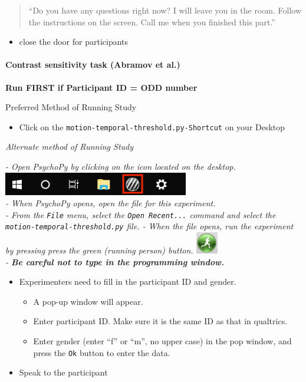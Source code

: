 \documentclass[]{article}
\providecommand{\tightlist}{%
  \setlength{\itemsep}{0pt}\setlength{\parskip}{0pt}}
\let\oldparagraph\paragraph
\renewcommand{\paragraph}[1]{\oldparagraph{#1}\mbox{}}
\begin{document}
\begin{quote}
``Do you have any questions right now? I will leave you in the room.
Follow the instructions on the screen. Call me when you finished this
part.''
\end{quote}

\begin{itemize}
\tightlist
\item
  close the door for participants
\end{itemize}

\hypertarget{contrast-sensitivity-task-abramov-et-al.}{%
\paragraph{Contrast sensitivity task (Abramov et
al.)}\label{contrast-sensitivity-task-abramov-et-al.}}

\textbf{Run FIRST if Participant ID = ODD number}

Preferred Method of Running Study

\begin{itemize}
\tightlist
\item
  Click on the \texttt{motion-temporal-threshold.py-Shortcut} on your
  Desktop
\end{itemize}

\emph{Alternate method of Running Study}

\emph{- Open PsychoPy by clicking on the icon located on the desktop.
\includegraphics{images/PsychoPy-1.PNG}\\
- When PsychoPy opens, open the file for this experiment.\\
- From the \texttt{File} menu, select the \texttt{Open\ Recent...}
command and select the \texttt{motion-temporal-threshold.py} file. -
When the file opens, run the experiment by pressing press the green
(running person) button. \includegraphics{images/PPrunningMan.png}\\
- \textbf{Be careful not to type in the programming window.}}

\begin{itemize}
\tightlist
\item
  Experimenters need to fill in the participant ID and gender.

  \begin{itemize}
  \tightlist
  \item
    A pop-up window will appear.
  \item
    Enter participant ID. Make sure it is the same ID as that in
    qualtrics.
  \item
    Enter gender (enter ``f'' or ``m'', no upper case) in the pop
    window, and press the \texttt{Ok} button to enter the data.
  \end{itemize}
\item
  Speak to the participant
\end{itemize}
\end{document}
